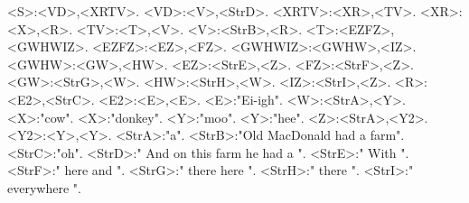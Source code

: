 <S>:<VD>,<XRTV>.
<VD>:<V>,<StrD>.
<XRTV>:<XR>,<TV>.
<XR>:<X>,<R>.
<TV>:<T>,<V>.
<V>:<StrB>,<R>.
<T>:<EZFZ>,<GWHWIZ>.
<EZFZ>:<EZ>,<FZ>.
<GWHWIZ>:<GWHW>,<IZ>.
<GWHW>:<GW>,<HW>.
<EZ>:<StrE>,<Z>.
<FZ>:<StrF>,<Z>.
<GW>:<StrG>,<W>.
<HW>:<StrH>,<W>.
<IZ>:<StrI>,<Z>.
<R>:<E2>,<StrC>.
<E2>:<E>,<E>.
<E>:"Ei-igh".
<W>:<StrA>,<Y>.
<X>:"cow".
<X>:"donkey".
<Y>:"moo".
<Y>:"hee".
<Z>:<StrA>,<Y2>.
<Y2>:<Y>,<Y>.
<StrA>:"a".
<StrB>:"Old MacDonald had a farm".
<StrC>:"oh".
<StrD>:" And on this farm he had a ".
<StrE>:" With ".
<StrF>:" here and ".
<StrG>:" there here ".
<StrH>:" there ".
<StrI>:" everywhere ".